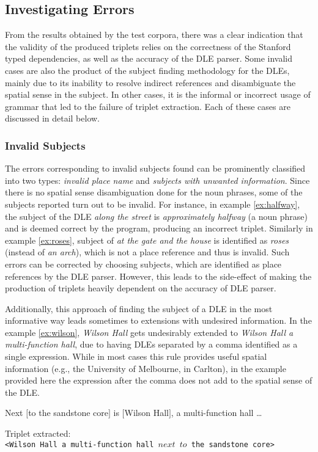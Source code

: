 \documentclass{sig-alternate}
\begin{document}
\subsection{Investigating Errors}
From the results obtained by the test corpora, there was a clear indication that the validity of the produced triplets relies on the correctness of the Stanford typed dependencies, as well as the accuracy of the DLE parser. Some invalid cases are also the product of the subject finding methodology for the DLEs, mainly due to its inability to resolve indirect references and disambiguate the spatial sense in the subject. In other cases, it is the informal or incorrect usage of grammar that led to the failure of triplet extraction. Each of these cases are discussed in detail below. 
\subsubsection{Invalid Subjects}
The errors corresponding to invalid subjects found can be prominently classified into two types: \textit{invalid place name} and \textit{subjects with unwanted information}. Since there is no spatial sense disambiguation done for the noun phrases, some of the subjects reported turn out to be invalid. For instance, in example \ref{ex:halfway}, the subject of the DLE \textit{along the street} is \textit{approximately halfway} (a noun phrase) and is deemed correct by the program, producing an incorrect triplet. Similarly in example \ref{ex:roses}, subject of \textit{at the gate and the house} is identified as \textit{roses} (instead of \textit{an arch}), which is not a place reference and thus is invalid. Such errors can be corrected by choosing subjects, which are identified as place references by the DLE parser. However, this leads to the side-effect of making the production of triplets heavily dependent on the accuracy of DLE parser.

Additionally, this approach of finding the subject of a DLE in the most informative way leads sometimes to extensions with undesired information. In the example \ref{ex:wilson}, \textit{Wilson Hall} gets undesirably extended to \textit{Wilson Hall a multi-function hall}, due to having DLEs separated by a comma identified as a single expression. While in most cases this rule provides useful spatial information (e.g., the University of Melbourne, in Carlton), in the example provided here the expression after the comma does not add to the spatial sense of the DLE.\vspace{-0.05in}
\begin{example}
\label{ex:wilson}
Next $[$to the sandstone core$]$ is $[$Wilson Hall$]$, a multi-function hall \dots \vspace{-0.05in}
\end{example}
Triplet extracted:\\
\texttt{<Wilson Hall a multi-function hall $next$ $to$ the sandstone core>} 
\end{document}
